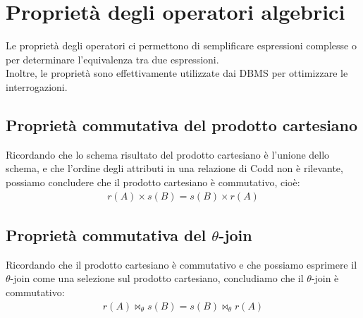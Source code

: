 \section{Proprietà degli operatori algebrici}
Le proprietà degli operatori ci permettono di semplificare espressioni complesse o per determinare l'equivalenza tra due espressioni.\\
Inoltre, le proprietà sono effettivamente utilizzate dai DBMS per ottimizzare le interrogazioni.

\subsection{Proprietà commutativa del prodotto cartesiano}
Ricordando che lo schema risultato del prodotto cartesiano è l'unione dello schema, e che l'ordine degli attributi in una relazione di Codd non è rilevante, possiamo concludere che il prodotto cartesiano è commutativo, cioè:
    \begin{equation}\begin{aligned}
        r(A) \times s(B) = s(B) \times r(A)
    \end{aligned}\end{equation}
    
\subsection{Proprietà commutativa del $\theta$-join}
Ricordando che il prodotto cartesiano è commutativo e che possiamo esprimere il $\theta$-join come una selezione sul prodotto cartesiano, concludiamo che il $\theta$-join è commutativo:
    \begin{equation}\begin{aligned}
        r(A) \bowtie_{\theta} s(B) = s(B) \bowtie_{\theta} r(A)
    \end{aligned}\end{equation}

